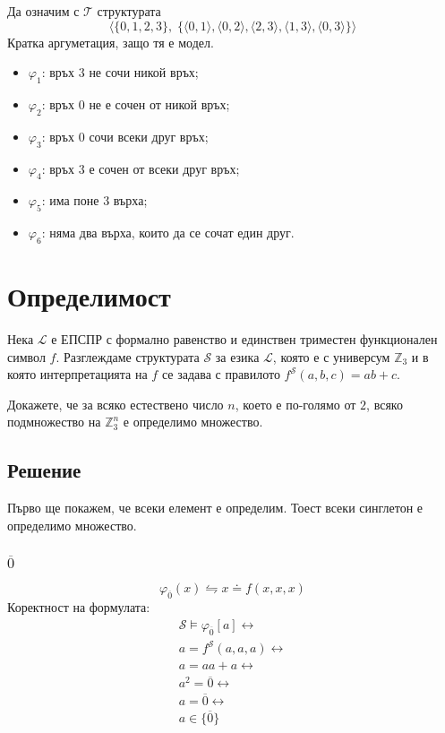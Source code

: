 \documentclass[17pt]{extarticle}
\begin{document}
Да означим с \(\mathcal T\) структурата
\[\langle \{0, 1, 2, 3\}, \; \{\langle 0, 1 \rangle, \langle 0, 2 \rangle, \langle 2, 3 \rangle, \langle 1, 3 \rangle, \langle 0, 3 \rangle\} \rangle\]
Кратка аргуметация, защо тя е модел.

\begin{itemize}
    \item \(\varphi_1\): връх \(3\) не сочи никой връх;
    \item \(\varphi_2\): връх \(0\) не е сочен от никой връх;
    \item \(\varphi_3\): връх \(0\) сочи всеки друг връх;
    \item \(\varphi_4\): връх \(3\) е сочен от всеки друг връх;
    \item \(\varphi_5\): има поне 3 върха;
    \item \(\varphi_6\): няма два върха, които да се сочат един друг.
\end{itemize}

\section{Определимост}
Нека \(\mathcal L\) е ЕПСПР с формално равенство и единствен триместен функционален символ \(f\).
Разглеждаме структурата \(\mathcal S\) за езика \(\mathcal L\), която е с универсум \(\mathbb{Z}_3\) и в която интерпретацията на \(f\) се задава с правилото
\(f^{\mathcal S}(a, b, c) = ab + c\).

Докажете, че за всяко естествено число \(n\), което е по-голямо от \(2\), всяко подмножество на \(\mathbb{Z}_3^n\) е определимо множество.

\subsection{Решение}
Първо ще покажем, че всеки елемент е определим. Тоест всеки синглетон е определимо множество.

\subsubsection{\(\overline 0\)}
\[\varphi_{\overline 0}(x) \leftrightharpoons x \doteq f(x, x, x)\]
Коректност на формулата:
\begin{align*}
    \mathcal S \models \varphi_{\overline 0}[a] \longleftrightarrow \\
    a = f^{\mathcal S}(a, a, a) \longleftrightarrow \\
    a = aa + a \longleftrightarrow \\
    a^2 = \overline 0 \longleftrightarrow \\
    a = \overline 0 \longleftrightarrow \\
    a \in \{\overline 0\}
\end{align*}
\end{document}
